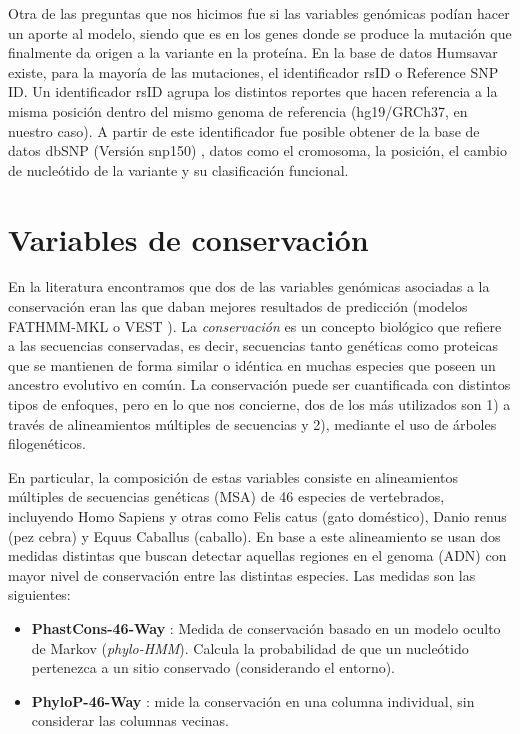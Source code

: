 
Otra de las preguntas que nos hicimos fue si las variables genómicas podían hacer un aporte al modelo, siendo que es en los genes donde se produce la mutación que finalmente da origen a la variante en la proteína. En la base de datos Humsavar existe, para la mayoría de las mutaciones, el identificador rsID o Reference SNP ID. Un identificador rsID agrupa los distintos reportes que hacen referencia a la misma posición dentro del mismo genoma de referencia (hg19/GRCh37, en nuestro caso). A partir de este identificador fue posible obtener de la base de datos dbSNP (Versión snp150) \cite{dbSNP}, datos como el cromosoma, la posición, el cambio de nucleótido de la variante y su clasificación funcional.

\section{Variables de conservación}

En la literatura encontramos que dos de las variables genómicas asociadas a la conservación eran las que daban mejores resultados de predicción (modelos FATHMM-MKL \cite{Shihab2015} o VEST \cite{Carter2013}). La \textit{conservación} es un concepto biológico que refiere a las secuencias conservadas, es decir, secuencias tanto genéticas como proteicas que se mantienen de forma similar o idéntica en muchas especies que poseen un ancestro evolutivo en común. La conservación puede ser cuantificada con distintos tipos de enfoques, pero en lo que nos concierne, dos de los más utilizados son 1) a través de alineamientos múltiples de secuencias y 2), mediante el uso de árboles filogenéticos.

En particular, la composición de estas variables consiste en alineamientos múltiples de secuencias genéticas (MSA) de 46 especies de vertebrados, incluyendo Homo Sapiens y otras como Felis catus (gato doméstico), Danio renus (pez cebra) y Equus Caballus (caballo). En base a este alineamiento se usan dos medidas distintas que buscan detectar aquellas regiones en el genoma (ADN) con mayor nivel de conservación entre las distintas especies. Las medidas son las siguientes:
\begin{itemize}
    \item \textbf{PhastCons-46-Way} \cite{siepel2005evolutionarily}: Medida de conservación basado en un modelo oculto de Markov (\textit{phylo-HMM}). Calcula la probabilidad de que un nucleótido pertenezca a un sitio conservado (considerando el entorno).
    \item \textbf{PhyloP-46-Way} \cite{Pollard2010}: mide la conservación en una columna individual, sin considerar las columnas vecinas.
\end{itemize}

